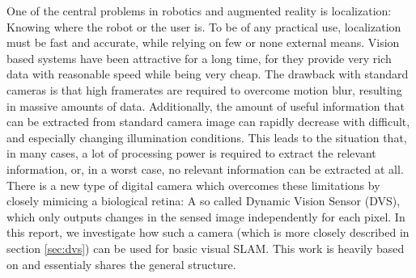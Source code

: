 One of the central problems in robotics and augmented reality is localization:
Knowing where the robot or the user is. To be of any practical use,
localization must be fast and accurate, while relying on few or none external
means.
Vision based systems have been attractive for a long time, for they provide very rich data
with reasonable speed while being very cheap. The drawback with standard cameras
is that high framerates are required to overcome motion blur, resulting in
massive amounts of data. Additionally, the amount of useful information that can be extracted
from standard camera image can rapidly decrease with difficult, and especially changing
illumination conditions. This leads to the situation that, in many cases, 
a lot of processing power is required to extract the relevant information, or,
in a worst case, no relevant information can be extracted at all.
There is a new type of digital camera which overcomes these limitations by
closely mimicing a biological retina: A so called Dynamic Vision Sensor (DVS),
which only outputs changes in the sensed image independently for each pixel.
In this report, we investigate how such a camera (which is more closely
described in section \ref{sec:dvs}) can be used for basic visual SLAM.
This work is heavily based on \cite{kim2014simultaneous} and essentialy shares
the general structure.
